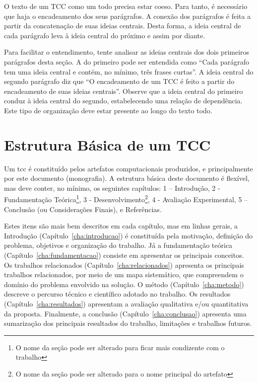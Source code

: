 \documentclass{eic-bcc-tcc}
\begin{document}
O texto de um TCC como um todo precisa estar coeso. Para tanto, é necessário que haja o encadeamento dos seus parágrafos. A conexão dos parágrafos é feita a partir da concatenação de suas ideias centrais. Desta forma, a ideia central de cada parágrafo leva à ideia central do próximo e assim por diante.

Para facilitar o entendimento, tente analisar as ideias centrais dos dois primeiros parágrafos desta seção. A do primeiro pode ser entendida como ``Cada parágrafo tem uma ideia central e contém, no mínimo, três frases curtas''. A ideia central do segundo parágrafo diz que ``O encadeamento de um TCC é feito a partir do encadeamento de suas ideias centrais''. Observe que a ideia central do primeiro conduz à ideia central do segundo, estabelecendo uma relação de dependência. Este tipo de organização deve estar presente ao longo do texto todo.

\section{Estrutura Básica de um TCC}

Um \gls{tcc} é constituído pelos artefatos computacionais produzidos, e principalmente por este documento (monografia). A estrutura básica deste documento é flexível, mas deve conter, no mínimo, os seguintes capítulos: 1 – Introdução, 2 - Fundamentação Teórica\footnote{O nome da seção pode ser alterado para ficar mais condizente com o trabalho}, 3 - Desenvolvimento\footnote{O nome da seção pode ser alterado para o nome principal do artefato}, 4 - Avaliação Experimental, 5 – Conclusão (ou Considerações Finais), e Referências.

Estes itens são mais bem descritos em cada capítulo, mas em linhas gerais, a Introdução (Capítulo~\ref{cha:introducao}) é constituída pela motivação, definição do problema, objetivos e organização do trabalho. Já a fundamentação teórica (Capítulo~\ref{cha:fundamentacao}) consiste em apresentar os principais conceitos. Os trabalhos relacionados (Capítulo~\ref{cha:relacionados}) apresenta os principais trabalhos relacionados, por meio de um mapa sistemático, que compreendem o domínio do problema envolvido na solução. O método (Capítulo~\ref{cha:metodo}) descreve o percurso técnico e científico adotado no trabalho. Os resultados (Capítulo~\ref{cha:resultados}) apresentam a avaliação qualitativa e/ou quantitativa da proposta. Finalmente, a conclusão (Capítulo~\ref{cha:conclusao}) apresenta uma sumarização dos principais resultados do trabalho, limitações e trabalhos futuros.
\end{document}
